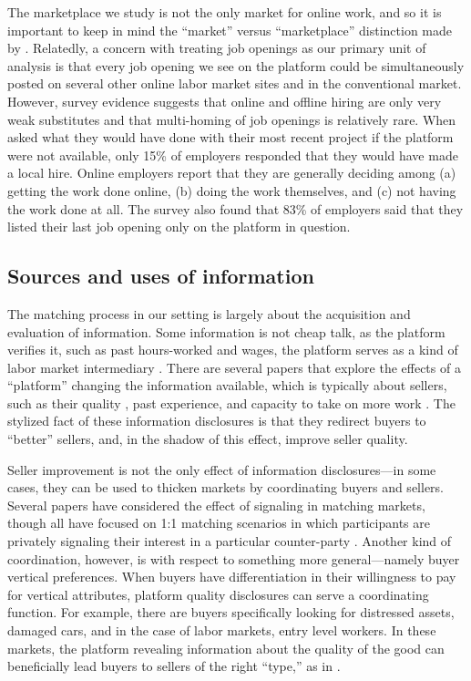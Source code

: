\documentclass[12pt]{article}
\begin{document}
The marketplace we study is not the only market for online work, and so it is important to keep in mind the ``market'' versus ``marketplace'' distinction made by \cite{roth2018}.
Relatedly, a concern with treating job openings as our primary unit of analysis is that every job opening we see on the platform could be simultaneously posted on several other online labor market sites and in the conventional market.
However, survey evidence suggests that online and offline hiring are only very weak substitutes and that multi-homing of job openings is relatively rare.
When asked what they would have done with their most recent project if the platform were not available, only 15\% of employers responded that they would have made a local hire.
Online employers report that they are generally deciding among (a) getting the work done online, (b) doing the work themselves, and (c) not having the work done at all.
The survey also found that 83\% of employers said that they listed their last job opening only on the platform in question. 

\subsection{Sources and uses of information}
The matching process in our setting is largely about the acquisition and evaluation of information.
Some information is not cheap talk, as the platform verifies it, such as past hours-worked and wages, the platform serves as a kind of labor market intermediary \citep{autor2008economics}.
There are several papers that explore the effects of a ``platform'' changing the information available, which is typically about sellers, such as their quality \citep{luca2016reviews, jin2003}, past experience, \citep{barach2016info} and capacity to take on more work \citep{horton2018scs}.
The stylized fact of these information disclosures is that they redirect buyers to ``better'' sellers, and, in the shadow of this effect, improve seller quality.

Seller improvement is not the only effect of information disclosures---in some cases, they can be used to thicken markets by coordinating buyers and sellers.
Several papers have considered the effect of signaling in matching markets, though all have focused on 1:1 matching scenarios in which participants are privately signaling their interest in a particular counter-party \citep{lee2011propose, coles2013preferencem, kushnir2013harmful}.
Another kind of coordination, however, is with respect to something more general---namely buyer vertical preferences.
When buyers have differentiation in their willingness to pay for vertical attributes, platform quality disclosures can serve a coordinating function. 
For example, there are buyers specifically looking for distressed assets, damaged cars, and in the case of labor markets, entry level workers.
In these markets, the platform revealing information about the quality of the good can beneficially lead buyers to sellers of the right ``type,'' as in \cite{tadelis2011information}.
\end{document}
